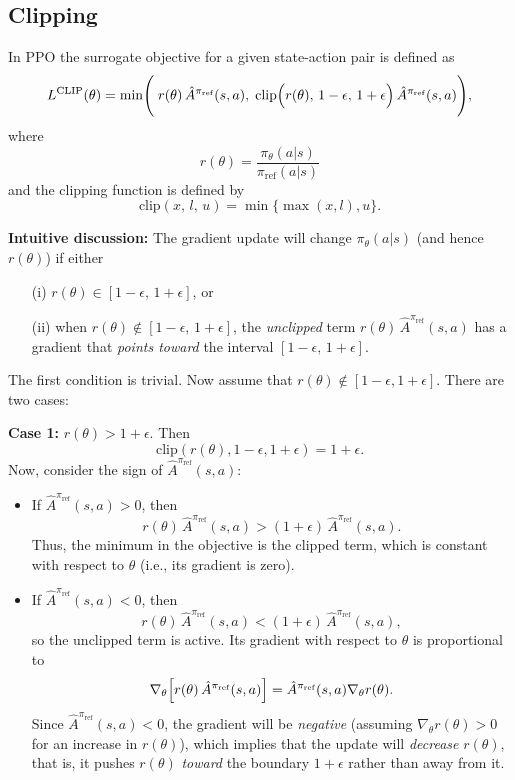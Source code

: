 \vspace{2mm}

\subsection{Clipping }

In PPO the surrogate objective for a given state-action pair is defined as
\[
  L^{\text{CLIP}}(\theta) = \min\Biggl( \; r(\theta)\,\hat{A}^{\pi_{\text{ref}}}(s,a), \;
  \text{clip}\Bigl( r(\theta),\, 1-\epsilon,\, 1+\epsilon \Bigr) \, \hat{A}^{\pi_{\text{ref}}}(s,a) \Biggr),
\]
where
\[
  r(\theta) = \frac{\pi_{\theta}(a|s)}{\pi_{\text{ref}}(a|s)}
\]
and the clipping function is defined by
\[
  \text{clip}(x,\, l,\, u) = \min\{\max(x,l),u\}.
\]

\textbf{Intuitive discussion:} The gradient update will change $\pi_{\theta}(a|s)$ (and hence $r(\theta)$) if either 
\begin{enumerate}
  \item[(i)] $r(\theta) \in [1-\epsilon,\,1+\epsilon]$, or 
  \item[(ii)] when $r(\theta) \notin [1-\epsilon,\,1+\epsilon]$, the \emph{unclipped} term $r(\theta)\,\hat{A}^{\pi_{\text{ref}}}(s,a)$ has a gradient that \emph{points toward} the interval $[1-\epsilon,\,1+\epsilon]$.
\end{enumerate}
The first condition is trivial. Now assume that $r(\theta)\notin[1-\epsilon,1+\epsilon]$. There are two cases:

\textbf{Case 1:} $r(\theta)>1+\epsilon$. Then
\[
  \text{clip}(r(\theta),1-\epsilon,1+\epsilon) = 1+\epsilon.
\]
Now, consider the sign of $\hat{A}^{\pi_{\text{ref}}}(s,a)$:
\begin{itemize}
  \item If $\hat{A}^{\pi_{\text{ref}}}(s,a)>0$, then 
  \[
    r(\theta)\,\hat{A}^{\pi_{\text{ref}}}(s,a) > (1+\epsilon)\,\hat{A}^{\pi_{\text{ref}}}(s,a).
  \]
  Thus, the minimum in the objective is the clipped term, which is constant with respect to $\theta$ (i.e., its gradient is zero).
  
  \item If $\hat{A}^{\pi_{\text{ref}}}(s,a)<0$, then 
  \[
    r(\theta)\,\hat{A}^{\pi_{\text{ref}}}(s,a) < (1+\epsilon)\,\hat{A}^{\pi_{\text{ref}}}(s,a),
  \]
  so the unclipped term is active. Its gradient with respect to $\theta$ is proportional to 
  \[
    \nabla_\theta \Bigl[ r(\theta)\,\hat{A}^{\pi_{\text{ref}}}(s,a) \Bigr] = \hat{A}^{\pi_{\text{ref}}}(s,a) \nabla_\theta r(\theta).
  \]
  Since $\hat{A}^{\pi_{\text{ref}}}(s,a) < 0$, the gradient will be \emph{negative} (assuming $\nabla_\theta r(\theta)>0$ for an increase in $r(\theta)$), which implies that the update will \emph{decrease} $r(\theta)$, that is, it pushes $r(\theta)$ \emph{toward} the boundary $1+\epsilon$ rather than away from it.
\end{itemize}

